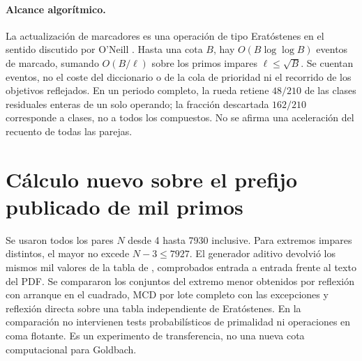\documentclass[11pt,a4paper]{article}
\newcommand{\B}[2]{#2}
\newcommand{\B}[2]{#1}
\begin{document}
\paragraph{\B{Algorithmic scope.}{Alcance algorítmico.}}
\B{The marker update is an Eratosthenes-style operation in the sense discussed by O'Neill \cite{oneill}. Through a bound $B$, the number of marking events is $O(B\log\log B)$, by summing $O(B/\ell)$ over odd primes $\ell\le\sqrt B$. The bound counts events, not the cost of the dictionary or priority queue, nor the work of scanning reflected targets. In a full period the wheel retains $48/210$ of the integer residue classes for a single operand; the $162/210$ discarded fraction is of classes, not of all composites. No speedup for counting all pairs is claimed.}{La actualización de marcadores es una operación de tipo Eratóstenes en el sentido discutido por O'Neill \cite{oneill}. Hasta una cota $B$, hay $O(B\log\log B)$ eventos de marcado, sumando $O(B/\ell)$ sobre los primos impares $\ell\le\sqrt B$. Se cuentan eventos, no el coste del diccionario o de la cola de prioridad ni el recorrido de los objetivos reflejados. En un periodo completo, la rueda retiene $48/210$ de las clases residuales enteras de un solo operando; la fracción descartada $162/210$ corresponde a clases, no a todos los compuestos. No se afirma una aceleración del recuento de todas las parejas.}


\section{\B{New calculation on the published 1000-prime prefix}{Cálculo nuevo sobre el prefijo publicado de mil primos}}
\B{We used every even $N$ from 4 through 7930 inclusive. For distinct odd endpoints the larger endpoint is at most $N-3\le7927$. The additive generator returned the same 1000 values as the table in \cite[Appendix B]{additive}, checked entry by entry against the PDF text. The run compared the sets of smaller endpoints produced by square-start reflection, complete-batch GCD with the exceptions, and direct reflection of an independently constructed Eratosthenes table. No probabilistic primality tests or floating-point operations enter this comparison. This is a transfer experiment, not a new computational bound for Goldbach.}{Se usaron todos los pares $N$ desde 4 hasta 7930 inclusive. Para extremos impares distintos, el mayor no excede $N-3\le7927$. El generador aditivo devolvió los mismos mil valores de la tabla de \cite[apéndice B]{additive}, comprobados entrada a entrada frente al texto del PDF. Se compararon los conjuntos del extremo menor obtenidos por reflexión con arranque en el cuadrado, MCD por lote completo con las excepciones y reflexión directa sobre una tabla independiente de Eratóstenes. En la comparación no intervienen tests probabilísticos de primalidad ni operaciones en coma flotante. Es un experimento de transferencia, no una nueva cota computacional para Goldbach.}
\end{document}
